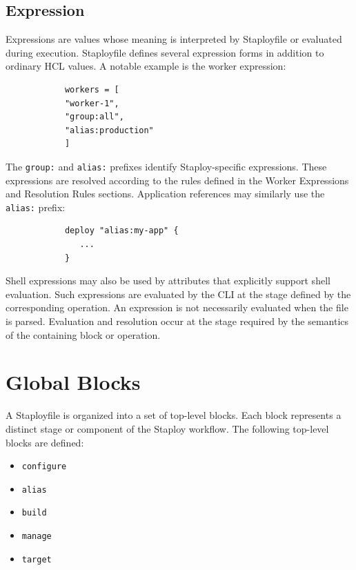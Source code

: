 \documentclass[11pt,a4paper]{article}
\begin{document}
    \subsection{Expression}\label{subsec:expressions}

    Expressions are values whose meaning is interpreted by Staployfile or evaluated during execution.
    Staployfile defines several expression forms in addition to ordinary HCL values.
    A notable example is the worker expression:

    \begin{center}
        \begin{verbatim}
            workers = [
            "worker-1",
            "group:all",
            "alias:production"
            ]
        \end{verbatim}
    \end{center}

    The \texttt{group:} and \texttt{alias:} prefixes identify Staploy-specific expressions.
    These expressions are resolved according to the rules defined in the Worker Expressions and Resolution Rules sections.
    Application references may similarly use the \texttt{alias:} prefix:

    \begin{center}
        \begin{verbatim}
            deploy "alias:my-app" {
               ...
            }
        \end{verbatim}
    \end{center}

    Shell expressions may also be used by attributes that explicitly support shell evaluation.
    Such expressions are evaluated by the CLI at the stage defined by the corresponding operation.
    An expression is not necessarily evaluated when the file is parsed.
    Evaluation and resolution occur at the stage required by the semantics
    of the containing block or operation.


    \section{Global Blocks}\label{sec:global-blocks}

    A Staployfile is organized into a set of top-level blocks.
    Each block represents a distinct stage or component of the Staploy workflow.
    The following top-level blocks are defined:

    \begin{itemize}
        \item \texttt{configure}
        \item \texttt{alias}
        \item \texttt{build}
        \item \texttt{manage}
        \item \texttt{target}
    \end{itemize}
\end{document}
